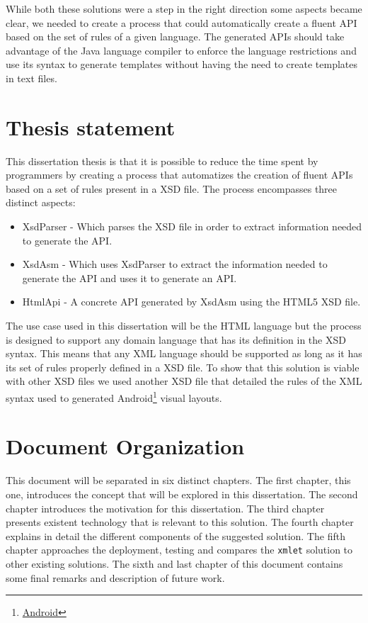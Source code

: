 \noindent
While both these solutions were a step in the right direction some aspects became clear, we needed to create a process that could automatically create a fluent \ac{API} based on the set of rules of a given language. The generated \ac{API}s should take advantage of the Java language compiler to enforce the language restrictions and use its syntax to generate templates without having the need to create templates in text files.

\section{Thesis statement}

This dissertation thesis is that it is possible to reduce the time spent by programmers by creating a process that automatizes the creation of fluent \ac{API}s based on a set of rules present in a \ac{XSD} file. The process encompasses three distinct aspects:

\begin{itemize}
	\item XsdParser - Which parses the \ac{XSD} file in order to extract information needed to generate the \ac{API}.
	\item XsdAsm - Which uses XsdParser to extract the information needed to generate the \ac{API} and uses it to generate an \ac{API}.
	\item HtmlApi - A concrete \ac{API} generated by XsdAsm using the \ac{HTML}5 \ac{XSD} file.
\end{itemize}

\noindent
The use case used in this dissertation will be the \ac{HTML} language but the process is designed to support any domain language that has its definition in the \ac{XSD} syntax. This means that any \ac{XML} language should be supported as long as it has its set of rules properly defined in a \ac{XSD} file. To show that this solution is viable with other \ac{XSD} files we used another \ac{XSD} file that detailed the rules of the \ac{XML} syntax used to generated Android\footnote{\href{https://www.android.com/}{Android}} visual layouts.

\section{Document Organization}

This document will be separated in six distinct chapters. The first chapter, this one, introduces the concept that will be explored in this dissertation. The second chapter introduces the motivation for this dissertation. The third chapter presents existent technology that is relevant to this solution. The fourth chapter explains in detail the different components of the suggested solution. The fifth chapter approaches the deployment, testing and compares the \texttt{xmlet} solution to other existing solutions. The sixth and last chapter of this document contains some final remarks and description of future work.